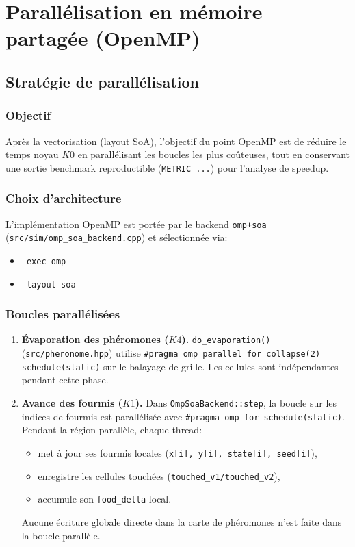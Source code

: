 \section{Parallélisation en mémoire partagée (OpenMP)}

\subsection{Stratégie de parallélisation}

\subsubsection{Objectif}

Après la vectorisation (layout SoA), l'objectif du point OpenMP est de réduire le temps noyau
\(K0\) en parallélisant les boucles les plus coûteuses, tout en conservant une sortie benchmark
reproductible (\texttt{METRIC ...}) pour l'analyse de speedup.

\subsubsection{Choix d'architecture}

L'implémentation OpenMP est portée par le backend \texttt{omp+soa}
(\texttt{src/sim/omp\_soa\_backend.cpp}) et sélectionnée via:
\begin{itemize}[leftmargin=*]
  \item \texttt{--exec omp}
  \item \texttt{--layout soa}
\end{itemize}

\subsubsection{Boucles parallélisées}

\begin{enumerate}[leftmargin=*]
  \item \textbf{Évaporation des phéromones (\(K4\)).}
  \texttt{do\_evaporation()} (\texttt{src/pheronome.hpp}) utilise
  \texttt{\#pragma omp parallel for collapse(2) schedule(static)} sur le balayage de grille.
  Les cellules sont indépendantes pendant cette phase.

  \item \textbf{Avance des fourmis (\(K1\)).}
  Dans \texttt{OmpSoaBackend::step}, la boucle sur les indices de fourmis est parallélisée avec
  \texttt{\#pragma omp for schedule(static)}. Pendant la région parallèle, chaque thread:
  \begin{itemize}[leftmargin=*]
    \item met à jour ses fourmis locales (\texttt{x[i], y[i], state[i], seed[i]}),
    \item enregistre les cellules touchées (\texttt{touched\_v1/touched\_v2}),
    \item accumule son \texttt{food\_delta} local.
  \end{itemize}
  Aucune écriture globale directe dans la carte de phéromones n'est faite dans la boucle parallèle.
\end{enumerate}

